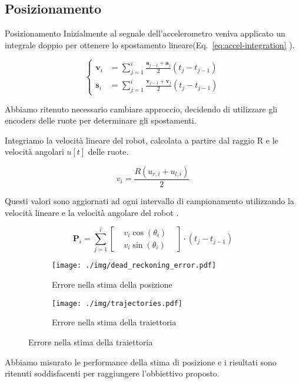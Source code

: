 \documentclass[10pt]{beamer}
\begin{document}
	\subsection{Posizionamento}\label{subsec:Posizionamento}
	\begin{frame}{Posizionamento}
		Inizialmente al segnale dell'accelerometro
		veniva applicato un integrale doppio per ottenere lo spostamento
		lineare(Eq.~\ref{eq:accel-integration} 	\cite{positioning}).
		
		\begin{equation}\label{eq:accel-integration}
			\begin{cases}
				\textbf{v}_i & = \sum_{j=1}^{i} \frac{\textbf{a} _{j-1}+\textbf{a} _j}{2} \left( t_j-t_{j-1} \right) \\
				\textbf{s}_i & = \sum_{j=1}^{i} \frac{\textbf{v} _{j-1}+\textbf{v} _j}{2} \left( t_j-t_{j-1} \right) 
			\end{cases}
		\end{equation}
		
		Abbiamo ritenuto necessario cambiare approccio, decidendo di utilizzare gli
		encoders delle ruote per determinare gli spostamenti. 
		
		Integriamo la velocità lineare del robot, calcolata a
		partire dal raggio R e le velocità angolari $u[t]$ delle ruote.
		
		\begin{equation}\label{eq:linear-velocity}
			v_i = \frac{R (u_{r,i}+u_{l,i})}{2}
		\end{equation}
		
		Questi valori sono aggiornati ad ogni intervallo di campionamento utilizzando la velocità lineare e la velocità angolare del robot \cite{572228}.
		
		\begin{equation}\label{eq:position-vector-update}
			\textbf{P}_i = \sum_{j = 1}^{i} \begin{bmatrix}
				 & v_i\cos(\theta_i ) & \\
				 & v_i\sin(\theta_i )
			\end{bmatrix}\cdot (t_j-t_{j-1}) 
		\end{equation}		
		
	\end{frame}
	\begin{frame}
		\begin{figure}[H]
			\begin{subfigure}{0.49\textwidth}
				\centering
				\texttt{[image: ./img/dead\_reckoning\_error.pdf]}
				\caption{Errore nella stima della posizione}
				\label{fig:dead_reckoning_error}
			\end{subfigure}
			\begin{subfigure}{0.49\textwidth}
				\centering
				\texttt{[image: ./img/trajectories.pdf]}
				\caption{Errore nella stima della traiettoria}
				\label{fig:trajectory_error}
			\end{subfigure}
		\end{figure}

		Abbiamo misurato le performance della stima di posizione e i risultati
		sono ritenuti soddisfacenti per raggiungere l'obbiettivo proposto.
	\end{frame}
	
\end{document}
